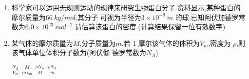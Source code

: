 \begin{enumerate}
\renewcommand{\labelenumi}{\arabic{enumi}.}
\item
{}
科学家可以运用无规则运动的规律来研究生物蛋白分子.资料显示,某种蛋白的摩尔质量为$ 66\ kg/mol $,其分子
可视为半径为$ 3 \times 10^{-9}\ m $ 的球,已知阿伏加德罗常数为$ 6.0 \times 10^{23}\ mol^{-2} $.请估算该蛋白的密度.(计算结果保留一位有效数字)
\vspace{1cm}

\item 
{}
某气体的摩尔质量为$ M $,分子质量为$ m $.若 1 摩尔该气体的体积为$ V_m $,密度为 $ \rho $,则该气体单位体积分子数为(阿伏伽
德罗常数为$ N_A $)  


\fourchoices
{$ \frac { N _ { \mathrm { A } } } { V _ { \mathrm { m } } } $}
{$\frac { M } { m V _ { \mathrm { m } } }$}
{$ \frac { \rho N _ { \mathrm { A } } } { M } $}
{$\frac { \rho N _ { \mathrm { A } } } { m }$}




\end{enumerate}

\fi
\fi

